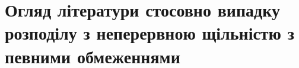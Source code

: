 \section{Огляд літератури стосовно випадку розподілу з неперервною щільністю з певними обмеженнями}
